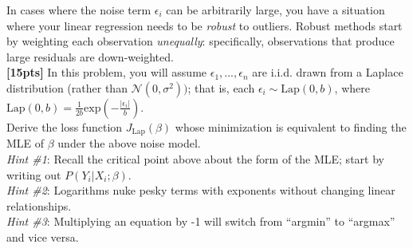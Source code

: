 \documentclass[paper=a4, fontsize=11pt]{scrartcl} %
\numberwithin{figure}{section} %
\numberwithin{table}{section} %
\begin{document}
In cases where the noise term $\epsilon_i$ can be arbitrarily large, you have a situation where your linear regression needs to be \emph{robust} to outliers. Robust methods start by weighting each observation \emph{unequally}: specifically, observations that produce large residuals are down-weighted. \\

\textbf{[15pts]} In this problem, you will assume $\epsilon_1, ..., \epsilon_n$ are i.i.d. drawn from a Laplace distribution (rather than $\mathcal{N}(0, \sigma^2))$; that is, each $\epsilon_i \sim \textrm{Lap}(0, b)$, where $\textrm{Lap}(0, b) = \frac{1}{2b} \textrm{exp}(-\frac{|\epsilon_i|}{b} )$. \\

Derive the loss function $J_{\textrm{Lap}}(\beta)$ whose minimization is equivalent to finding the MLE of $\beta$ under the above noise model. \\

\emph{Hint \#1}: Recall the critical point above about the form of the MLE; start by writing out $P(Y_i | X_i; \beta)$. \\

\emph{Hint \#2}: Logarithms nuke pesky terms with exponents without changing linear relationships. \\

\emph{Hint \#3}: Multiplying an equation by -1 will switch from ``argmin'' to ``argmax'' and vice versa. \\
\end{document}
